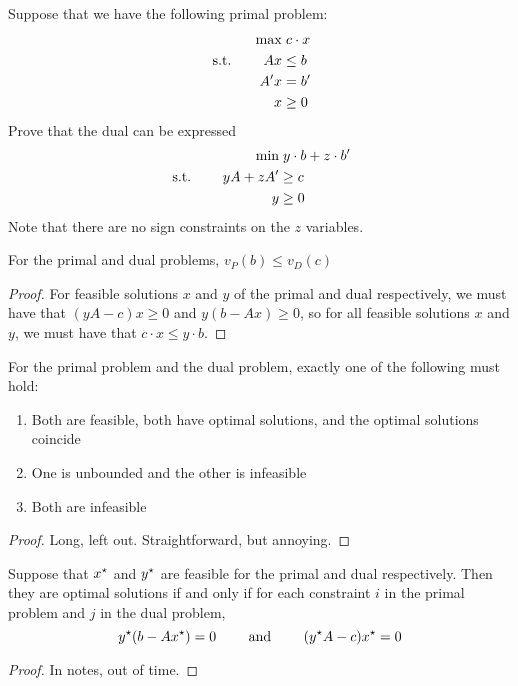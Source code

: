 \documentclass[10pt]{article}
\begin{document}
\begin{exercise}
	Suppose that we have the following primal problem:
	\begin{align*}
		\max &\; c \cdot x \\ \;\text{s.t.}\; \qquad Ax &\le b \\ A'x &= b' \\ x &\ge 0
	\end{align*}
	Prove that the dual can be expressed
	\begin{align*}
		\min &\; y \cdot b + z \cdot b' \\ \;\text{s.t.}\; \qquad yA + zA' &\ge c \\ y&\ge 0
	\end{align*}
	Note that there are no sign constraints on the $z$ variables.
\end{exercise}

\begin{theorem}
	 For the primal and dual problems, $v_P(b) \le v_D(c)$
\end{theorem}
\begin{proof}
	For feasible solutions $x$ and $y$ of the primal and dual respectively, we must have that $(yA - c)x \ge 0$ and $y (b - Ax) \ge 0$, so for all feasible solutions $x$ and $y$, we must have that $c \cdot x \le y \cdot b$.
\end{proof}

\begin{theorem}
	 For the primal problem and the dual problem, exactly one of the following must hold:
	\begin{enumerate}
		\item Both are feasible, both have optimal solutions, and the optimal solutions coincide
		\item One is unbounded and the other is infeasible
		\item Both are infeasible
	\end{enumerate}
\end{theorem}
\begin{proof}
	Long, left out. Straightforward, but annoying.
\end{proof}



\begin{theorem}
	 Suppose that $x^\star$ and $y^\star$ are feasible for the primal and dual respectively. Then they are optimal solutions if and only if for each constraint $i$ in the primal problem and $j$ in the dual problem,
	\[
	y^\star (b - Ax^\star) = 0 \qquad \text{ and } \qquad (y^\star A - c)x^\star = 0
	\]
\end{theorem}
\begin{proof}
	In notes, out of time.
\end{proof}
\end{document}
